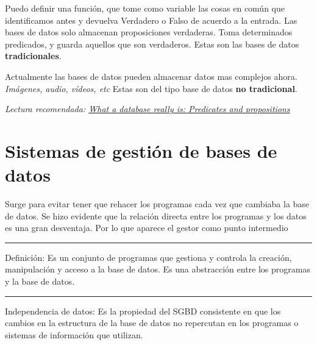 Puedo definir una función, que tome como variable las cosas en común que identificamos antes y devuelva Verdadero o Falso de acuerdo a la entrada. Las bases de datos solo almacenan proposiciones verdaderas. Toma determinados predicados, y guarda aquellos que son verdaderos. Estas son las bases de datos \textbf{tradicionales}.

\smallskip

Actualmente las bases de datos pueden almacenar datos mas complejos ahora. \textit{Imágenes, audio, vídeos, etc} Estas son del tipo base de datos \textbf{no tradicional}.

\medskip

\textit{Lectura recomendada: \href{https://www.dcs.warwick.ac.uk/~hugh/M359/What-a-Database-Really-Is.pdf}{What a database really is: Predicates and propositions}}


\section{Sistemas de gestión de bases de datos}
Surge para evitar tener que rehacer los programas cada vez que cambiaba la base de datos. Se hizo evidente que la relación directa entre los programas y los datos es una gran desventaja. Por lo que aparece el gestor como punto intermedio

\noindent\rule{\textwidth}{0.5pt}

Definición: Es un conjunto de programas que gestiona y controla la creación, manipulación y acceso a la base de datos. Es una abstracción entre los programas y la base de datos.

\noindent\rule{\textwidth}{0.5pt}

\smallskip

Independencia de datos: Es la propiedad del SGBD consistente en que los cambios en la estructura de la base de datos no repercutan en los programas o sistemas de información que utilizan.


